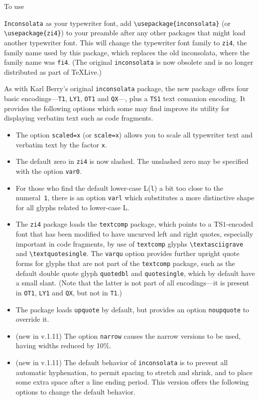 \documentclass[11pt]{article}
\begin{document}
To use {\texttt{Inconsolata} as your typewriter font, add \verb|\usepackage{inconsolata}| (or \verb|\usepackage{zi4}|) to your preamble after any other packages that might load another typewriter font. This
will change the typewriter font family to \texttt{zi4}, the family name used
by this package, which replaces the old \textsf{inconsolata}, where the family name was \texttt{fi4}.  (The original {\tt inconsolata} is now obsolete and is no longer distributed as part of \TeX Live.) 

As with Karl Berry's original \texttt{inconsolata} package, the new package offers four basic encodings---\texttt{T1}, \texttt{LY1}, \texttt{OT1} and \texttt{QX}---, plus a \texttt{TS1} text comanion encoding. It provides the following options which some may find improve its utility for displaying verbatim text such as code fragments. 
\begin{itemize}
\item The option \texttt{scaled=x} (or \texttt{scale=x}) allows you to scale all typewriter text and verbatim text by the factor \texttt{x}.
\item
The default zero in \texttt{zi4} is now slashed. The unslashed zero may be specified with the option \texttt{var0}.
\item For those who find the default lower-case L(\texttt{l}) a bit too close to the numeral~\texttt{1}, there is an option \texttt{varl} which substitutes a more distinctive shape for all glyphs related to lower-case L.
\item The \texttt{zi4} package loads the \texttt{textcomp} package, which points to a TS$1$-encoded font that has been modified to have uncurved left and right quotes, especially important in code fragments, by use of \texttt{textcomp} glyphs \verb|\textasciigrave| and \verb|\textquotesingle|. The \texttt{varqu} option provides further upright quote forms for glyphs that are not part of the \texttt{textcomp} package, such as 
the default double quote glyph \texttt{quotedbl} and \texttt{quotesingle}, which by default have a small slant. (Note that the latter is not part of all encodings---it is present in \texttt{OT1}, \texttt{LY1} and \texttt{QX}, but not in \texttt{T1}.)
\item The package loads \texttt{upquote} by default, but provides an option \texttt{noupquote} to override it.
\item (new in v.1.11) The option \texttt{narrow} causes the narrow versions to be used, having widths reduced by 10\%.
\item (new in v.1.11) The default behavior of {\tt inconsolata} is to prevent all automatic hyphenation, to permit spacing to stretch and shrink, and to place some extra space after a line ending period. This version offers the following options to change the default behavior.  

\end{itemize}}
\end{document}
